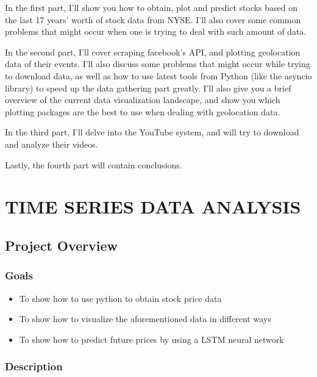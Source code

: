 \documentclass[12pt, a4paper]{article}
\begin{document}
In the first part, I'll show you how to obtain, plot and predict stocks based on the last 17 years' worth of stock data from NYSE\footnotemark. I'll also cover some common problems that might occur when one is trying to deal with such amount of data.

In the second part, I'll cover scraping facebook's API, and plotting geolocation data of their events. I'll also discuss some problems that might occur while trying to download data, as well as how to use latest tools from Python (like the asyncio library) to speed up the data gathering part greatly. I'll also give you a brief overview of the current data visualization landscape, and show you which plotting packages are the best to use when dealing with geolocation data.

In the third part, I'll delve into the YouTube system, and will try to download and analyze their videos.

Lastly, the fourth part will contain conclusions.

\newpage
\section{TIME SERIES DATA ANALYSIS}
\subsection{Project Overview}

\subsubsection{Goals}

\begin{itemize}
	\item To show how to use python to obtain stock price data
	\item To show how to visualize the aforementioned data in different ways
	\item To show how to predict future prices by using a LSTM neural network
\end{itemize}

\subsubsection{Description}
\end{document}
